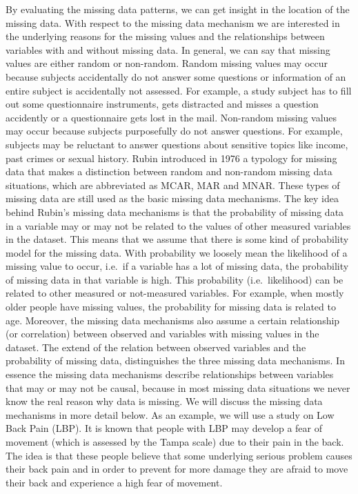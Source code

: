 \documentclass[]{book}
\begin{document}
By evaluating the missing data patterns, we can get insight in the
location of the missing data. With respect to the missing data mechanism
we are interested in the underlying reasons for the missing values and
the relationships between variables with and without missing data. In
general, we can say that missing values are either random or non-random.
Random missing values may occur because subjects accidentally do not
answer some questions or information of an entire subject is
accidentally not assessed. For example, a study subject has to fill out
some questionnaire instruments, gets distracted and misses a question
accidently or a questionnaire gets lost in the mail. Non-random missing
values may occur because subjects purposefully do not answer questions.
For example, subjects may be reluctant to answer questions about
sensitive topics like income, past crimes or sexual history. Rubin
introduced in 1976 a typology for missing data that makes a distinction
between random and non-random missing data situations, which are
abbreviated as MCAR, MAR and MNAR. These types of missing data are still
used as the basic missing data mechanisms. The key idea behind Rubin's
missing data mechanisms is that the probability of missing data in a
variable may or may not be related to the values of other measured
variables in the dataset. This means that we assume that there is some
kind of probability model for the missing data. With probability we
loosely mean the likelihood of a missing value to occur, i.e.~if a
variable has a lot of missing data, the probability of missing data in
that variable is high. This probability (i.e.~likelihood) can be related
to other measured or not-measured variables. For example, when mostly
older people have missing values, the probability for missing data is
related to age. Moreover, the missing data mechanisms also assume a
certain relationship (or correlation) between observed and variables
with missing values in the dataset. The extend of the relation between
observed variables and the probability of missing data, distinguishes
the three missing data mechanisms. In essence the missing data
mechanisms describe relationships between variables that may or may not
be causal, because in most missing data situations we never know the
real reason why data is missing. We will discuss the missing data
mechanisms in more detail below. As an example, we will use a study on
Low Back Pain (LBP). It is known that people with LBP may develop a fear
of movement (which is assessed by the Tampa scale) due to their pain in
the back. The idea is that these people believe that some underlying
serious problem causes their back pain and in order to prevent for more
damage they are afraid to move their back and experience a high fear of
movement.
\end{document}
